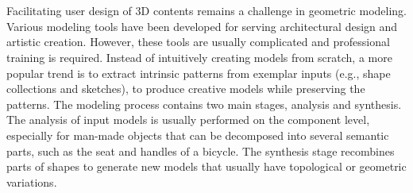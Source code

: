

\chapter*{}




Facilitating user design of 3D contents remains a challenge in geometric modeling. Various modeling tools have been developed for serving architectural design and artistic creation. However, these tools are usually complicated and professional training is required. Instead of intuitively creating models from scratch, a more popular trend is to extract intrinsic patterns from exemplar inputs (e.g., shape collections and sketches), to produce creative models while preserving the patterns. The modeling process contains two main stages, analysis and synthesis. The analysis of input models is usually performed on the component level, especially for man-made objects that can be decomposed into several semantic parts, such as the seat and handles of a bicycle. The synthesis stage recombines parts of shapes to generate new models that usually have topological or geometric variations.

